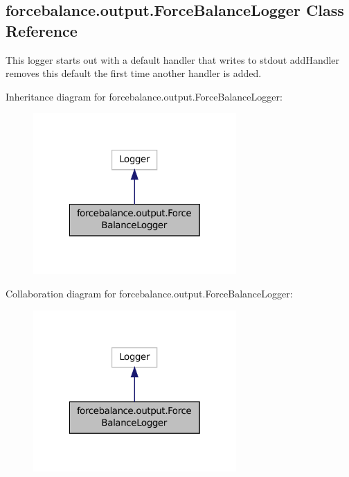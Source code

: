 \hypertarget{classforcebalance_1_1output_1_1ForceBalanceLogger}{\subsection{forcebalance.\-output.\-Force\-Balance\-Logger Class Reference}
\label{classforcebalance_1_1output_1_1ForceBalanceLogger}
}


This logger starts out with a default handler that writes to stdout add\-Handler removes this default the first time another handler is added.  




Inheritance diagram for forcebalance.\-output.\-Force\-Balance\-Logger\-:
\nopagebreak
\begin{figure}[H]
\begin{center}
\leavevmode
\includegraphics[width=220pt]{classforcebalance_1_1output_1_1ForceBalanceLogger__inherit__graph}
\end{center}
\end{figure}


Collaboration diagram for forcebalance.\-output.\-Force\-Balance\-Logger\-:
\nopagebreak
\begin{figure}[H]
\begin{center}
\leavevmode
\includegraphics[width=220pt]{classforcebalance_1_1output_1_1ForceBalanceLogger__coll__graph}
\end{center}
\end{figure}
